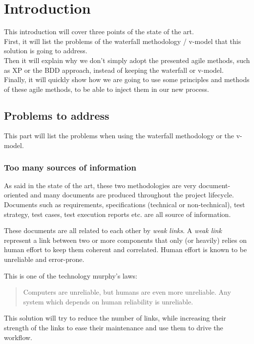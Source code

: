 \section{Introduction}\label{sec:introduction}

This introduction will cover three points of the state of the art. \\
First, it will list the problems of the waterfall methodology / v-model
that this solution is going to address. \\
Then it will explain why we don't simply adopt the presented agile methods, such
as XP or the BDD approach, instead of keeping the waterfall or v-model. \\
Finally, it will quickly show how we are going to use some principles and
methods of these agile methods, to be able to inject them in our new process.

\subsection{Problems to address}\label{subsec:problems-to-address}

This part will list the problems when using the waterfall methodology or the
v-model.

\subsubsection{Too many sources of information}
As said in the state of the art, these two methodologies are very
document-oriented and many documents are produced throughout the project
lifecycle.
Documents such as requirements, specifications (technical or non-technical),
test strategy, test cases, test execution reports etc.
are all source of information.

These documents are all related to each other by \textit{weak links}.
A \textit{weak link} represent a link between two or more components that
only (or heavily) relies on human effort to keep them coherent and correlated.
Human effort is known to be unreliable and error-prone.

This is one of the technology murphy's laws:
\begin{quote}
    Computers are unreliable, but humans are even more unreliable.
    Any system which depends on human reliability is unreliable.
\end{quote}

This solution will try to reduce the number of links, while increasing their
strength of the links to ease their maintenance and use them to drive the
workflow.

